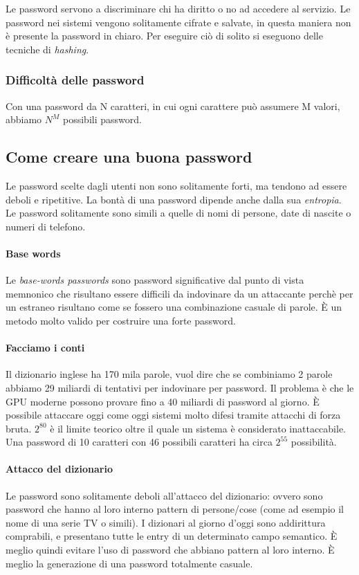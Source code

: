 Le password servono a discriminare chi ha diritto o no ad accedere al servizio.
Le password nei sistemi vengono solitamente cifrate e salvate, in questa
maniera non è presente la password in chiaro. Per eseguire ciò di solito si
eseguono delle tecniche di \textit{hashing}.

\subsubsection{Difficoltà delle password}

Con una password da N caratteri, in cui ogni carattere può assumere M valori,
abbiamo $N^M$ possibili password.

\subsection{Come creare una buona password}

Le password scelte dagli utenti non sono solitamente forti, ma tendono ad
essere deboli e ripetitive. La bontà di una password dipende anche dalla sua
\textit{entropia}.
Le password solitamente sono simili a quelle di nomi di persone, date di
nascite o numeri di telefono.

\paragraph*{Base words}
Le \textit{base-words passwords} sono password significative dal punto di vista
memnonico che risultano essere difficili da indovinare da un attaccante perchè
per un estraneo risultano come se fossero una combinazione casuale di parole.
È un metodo molto valido per costruire una forte password.

\paragraph*{Facciamo i conti}

Il dizionario inglese ha 170 mila parole, vuol dire che se combiniamo 2 parole
abbiamo 29 miliardi di tentativi per indovinare per password. Il problema è che
le GPU moderne possono provare fino a 40 miliardi di password al giorno.
È possibile attaccare oggi come oggi sistemi molto difesi tramite attacchi di
forza bruta.
$2^{80}$ è il limite teorico oltre il quale un sistema è considerato
inattaccabile. Una password di 10 caratteri con 46 possibili caratteri ha circa
$2^{55}$ possibilità.

\paragraph*{Attacco del dizionario}
Le password sono solitamente deboli all'attacco del dizionario: ovvero sono
password che hanno al loro interno pattern di persone/cose (come ad esempio il
nome di una serie TV o simili). I dizionari al giorno d'oggi sono addirittura
comprabili, e presentano tutte le entry di un determinato campo semantico.
È meglio quindi evitare l'uso di password che abbiano pattern al loro interno.
È meglio la generazione di una password totalmente casuale.

